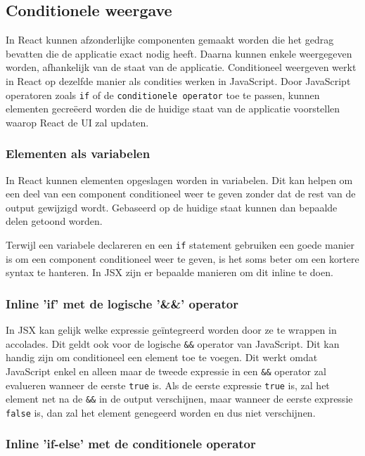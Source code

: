 \subsection{Conditionele weergave}

In React kunnen afzonderlijke componenten gemaakt worden die het gedrag bevatten die de applicatie exact nodig heeft. Daarna kunnen enkele weergegeven worden, afhankelijk van de staat van de applicatie. Conditioneel weergeven werkt in React op dezelfde manier als condities werken in JavaScript. Door JavaScript operatoren zoals \texttt{if} of de \texttt{conditionele operator} toe te passen, kunnen elementen gecreëerd worden die de huidige staat van de applicatie voorstellen waarop React de UI zal updaten. \autocite{React2019g}

\subsubsection{Elementen als variabelen}

In React kunnen elementen opgeslagen worden in variabelen. Dit kan helpen om een deel van een component conditioneel weer te geven zonder dat de rest van de output gewijzigd wordt. Gebaseerd op de huidige staat kunnen dan bepaalde delen getoond worden.  \autocite{React2019g}

Terwijl een variabele declareren en een \texttt{if} statement gebruiken een goede manier is om een component conditioneel weer te geven, is het soms beter om een kortere syntax te hanteren. In JSX zijn er bepaalde manieren om dit inline te doen. \autocite{React2019g}

\subsubsection{Inline 'if' met de logische '\&\&' operator}

In JSX kan gelijk welke expressie geïntegreerd worden door ze te wrappen in accolades. Dit geldt ook voor de logische \texttt{\&\&} operator van JavaScript. Dit kan handig zijn om conditioneel een element toe te voegen. Dit werkt omdat JavaScript enkel en alleen maar de tweede expressie in een \texttt{\&\&} operator zal evalueren wanneer de eerste \texttt{true} is. Als de eerste expressie \texttt{true} is, zal het element net na de \texttt{\&\&} in de output verschijnen, maar wanneer de eerste expressie \texttt{false} is, dan zal het element genegeerd worden en dus niet verschijnen. \autocite{React2019g}

\subsubsection{Inline 'if-else' met de conditionele operator}

